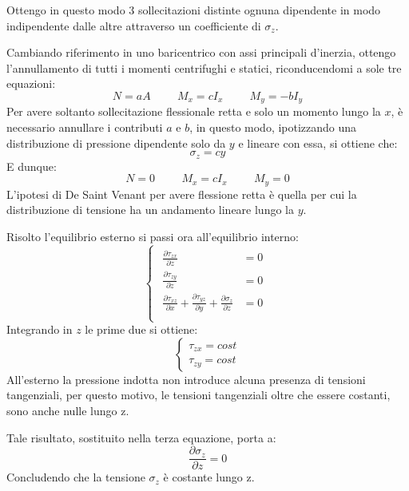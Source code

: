 		Ottengo in questo modo 3 sollecitazioni distinte ognuna dipendente in modo indipendente dalle altre attraverso un coefficiente di $\sigma_z$. \newline 
		
		Cambiando riferimento in uno baricentrico con assi principali d'inerzia, ottengo l'annullamento di tutti i momenti centrifughi e statici, riconducendomi a sole tre equazioni:
		\[ N = aA \hspace{1cm} M_x = cI_x \hspace{1cm} M_y = - bI_y  \]
		Per avere soltanto sollecitazione flessionale retta e solo un momento lungo la $x$, è necessario annullare i contributi $a$ e $b$, in questo modo, ipotizzando una distribuzione di pressione dipendente solo da $y$ e lineare con essa, si ottiene che: 
		\[\sigma_z = cy\]
		E dunque: 
		\begin{equation}
			\boxed{N = 0 \hspace{1cm} M_x = cI_x \hspace{1cm} M_y = 0}  
		\end{equation}
		L'ipotesi di De Saint Venant per avere flessione retta è quella per cui la distribuzione di tensione ha un andamento lineare lungo la $y$. \newline 
		
		Risolto l'equilibrio esterno si passi ora all'equilibrio interno:
			\[ \begin{cases}
			\begin{aligned}
				\frac{\partial \tau_{zx}}{\partial z} & =0 \\
				
				\frac{\partial \tau_{zy}}{\partial z} & =0 \\
				
				\frac{\partial \tau_{xz}}{\partial x} + \frac{\partial \tau_{yz}}{\partial y} + \frac{\partial\sigma_z}{\partial z} & =0 \\
			\end{aligned}
		\end{cases}\]
		Integrando in $z$ le prime due si ottiene:
		\[\begin{cases}
			\tau_{zx} = cost \\
			\tau_{zy} = cost 
		\end{cases}\]
		All'esterno la pressione indotta non introduce alcuna presenza di tensioni tangenziali, per questo motivo, le tensioni tangenziali oltre che essere costanti, sono anche nulle lungo z. 
		
		Tale risultato, sostituito nella terza equazione, porta a:
		\[ \frac{\partial\sigma_z}{\partial z}  =0\]
		Concludendo che la tensione $\sigma_z$ è costante lungo z. \newline 
		
